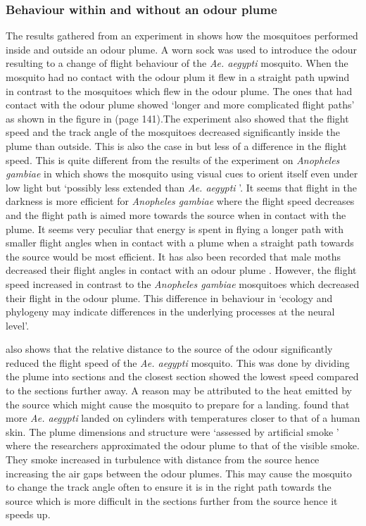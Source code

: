 \subsubsection{Behaviour within and without an odour plume}
The results gathered from an experiment in \cite{beeuwkes20083} shows how the mosquitoes performed inside and outside an odour plume. A worn sock was used to introduce the odour resulting to a change of flight behaviour of the \textit{Ae. aegypti} mosquito. When the mosquito had no contact with the odour plum it flew in a straight path upwind in contrast to the mosquitoes which flew in the odour plume. The ones that had contact with the odour plume showed \lq longer and more complicated flight paths' as shown in the figure in \cite{beeuwkes20083} (page 141).The experiment also showed that the flight speed and the track angle of the mosquitoes decreased significantly inside the plume than outside. This is also the case in \cite{Dekker2963} but less of a difference in the flight speed. This is quite different from the results of the experiment on \textit{Anopheles gambiae} in \cite{gibson1995behavioural, tirados2006blood} which shows the mosquito using visual cues to orient itself even under low light but \lq possibly less extended than \textit{Ae. aegypti} \rq\cite{beeuwkes20083}. It seems that flight in the darkness is more efficient for \textit{Anopheles gambiae} where the flight speed decreases and the flight path is aimed more towards the source when in contact with the plume. It seems very peculiar that energy is spent in flying a longer path with smaller flight angles when in contact with a plume when a straight path towards the source would be most efficient. It has also been recorded that male moths decreased their flight angles in contact with an odour plume \cite{mafra1994}. However, the flight speed increased in contrast to the \textit{Anopheles gambiae} mosquitoes which decreased their flight in the odour plume. This difference in behaviour in \lq ecology and phylogeny may indicate differences in the underlying processes at the neural level\rq\cite{beeuwkes20083}. 

\cite{beeuwkes20083} also shows that the relative distance to the source of the odour significantly reduced the flight speed of the \textit{Ae. aegypti} mosquito. This was done by dividing the plume into sections and the closest section showed the lowest speed compared to the sections further away. A reason may be attributed to the heat emitted by the source which might cause the mosquito to prepare for a landing. \cite{healy2002landing} found that more \textit{Ae. aegypti} landed on cylinders with temperatures closer to that of a human skin. The plume dimensions and structure were \lq assessed by artificial smoke \rq\cite{beeuwkes20083} where the researchers approximated the odour plume to that of the visible smoke. They smoke increased in turbulence with distance from the source hence increasing the air gaps between the odour plumes. This may cause the mosquito to change the track angle often to ensure it is in the right path towards the source which is more difficult in the sections further from the source hence it speeds up. 

